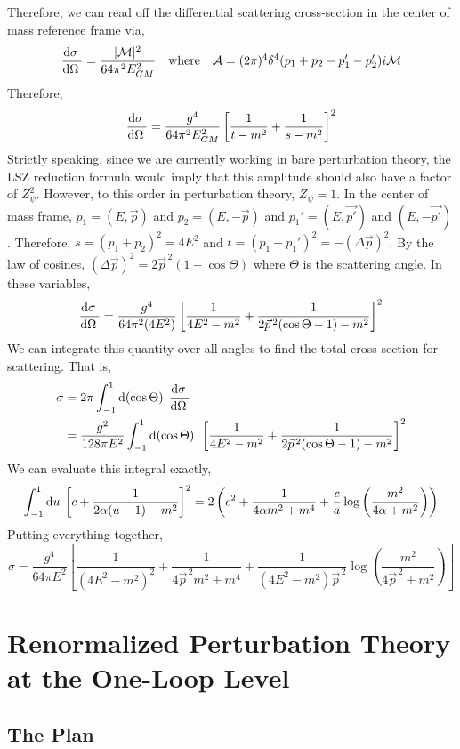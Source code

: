 \documentclass{article}
\begin{document}
Therefore, we can read off the differential scattering cross-section in the center of mass reference frame via,
\[ \frac{\mathrm{d}\sigma \:}{\mathrm{d}\Omega \:} = \frac{|\mathcal{M}|^2}{64 \pi^2 E_{CM}^2}
 \quad \text{where} \quad \mathcal{A} = (2 \pi)^4 \delta^4(p_1 + p_2 - p_1' - p_2') i \mathcal{M}\]
Therefore,
\[ \frac{\mathrm{d}\sigma \:}{\mathrm{d}\Omega \:} = \frac{g^4}{64 \pi^2 E_{CM}^2} \left[ \frac{1}{t - m^2} + \frac{1}{s - m^2} \right]^2 \]
Strictly speaking, since we are currently working in bare perturbation theory, the LSZ reduction formula would imply that this amplitude should also have a factor of $Z_\psi^2$. However, to this order in perturbation theory, $Z_\psi = 1$.
In the center of mass frame, $p_1 = (E, \vec{p})$ and $p_2 = (E, -\vec{p})$ and $p_1' = (E, \vec{p'})$ and $(E, -\vec{p'})$. Therefore, $s = (p_1 + p_2)^2 = 4 E^2$ and $t = (p_1 - p_1')^2 = - (\Delta \vec{p})^2$. By the law of cosines, $(\Delta \vec{p})^2 = 2 \vec{p}^{\, 2} (1 - \cos{\Theta})$ where $\Theta$ is the scattering angle. In these variables,
\[ \frac{\mathrm{d}\sigma \:}{\mathrm{d}\Omega \:} = \frac{g^4}{64 \pi^2 (4 E^2)} \left[ \frac{1}{4 E^2 - m^2} + \frac{1}{2 \vec{p}^{\, 2} ( \cos{\Theta} - 1)  - m^2} \right]^2 \]
We can integrate this quantity over all angles to find the total cross-section for scattering. That is,
\begin{align*}
\sigma &= 2 \pi \int_{-1}^1 \mathrm{d}(\cos{\Theta}) \: \: \frac{\mathrm{d}\sigma \:}{\mathrm{d}\Omega \:} \\
& = \frac{g^2}{128 \pi E^2} \int_{-1}^1 \mathrm{d}(\cos{\Theta}) \: \: \left[ \frac{1}{4 E^2 - m^2} + \frac{1}{2 \vec{p}^{\, 2} ( \cos{\Theta} - 1)  - m^2} \right]^2
\end{align*}
We can evaluate this integral exactly,
\[ \int_{-1}^1 \mathrm{d}u \: \left[c + \frac{1}{2 \alpha (u -1) - m^2} \right]^2 = 2 \left(c^2 + \frac{1}{4 \alpha m^2 + m^4} + \frac{c}{a} \log{\left(\frac{m^2}{4 \alpha + m^2}\right)} \right)\]
Putting everything together,
\[ \sigma = \frac{g^4}{64 \pi E^2} \left[ \frac{1}{(4 E^2 - m^2)^2} + \frac{1}{4 \vec{p}^{\, 2} m^2 + m^4} + \frac{1}{(4 E^2 - m^2) \vec{p}^{\, 2}} \log{\left(\frac{m^2}{4 \vec{p}^{\, 2} + m^2}\right)}   \right] \]

\section*{Renormalized Perturbation Theory at the One-Loop Level}

\subsection*{The Plan}
\end{document}
